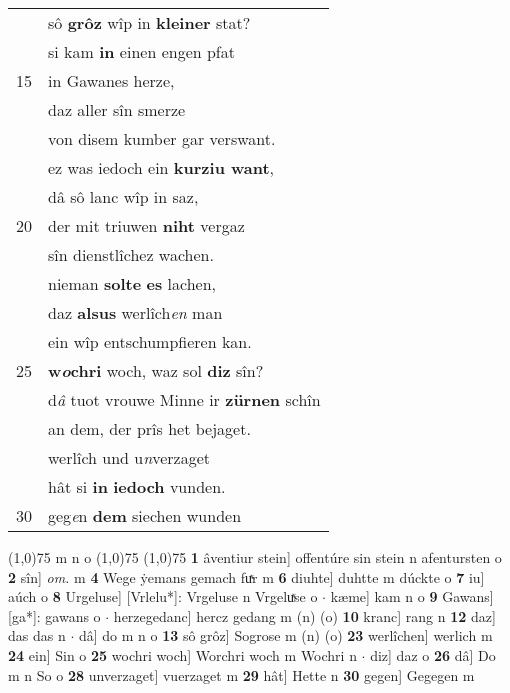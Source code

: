 \documentclass[8pt,a4paper,notitlepage]{article}
\begin{document}
\begin{table}[ht]
\begin{minipage}[t]{0.5\linewidth}
\begin{tabular}{rl}
 & sô \textbf{grôz} wîp in \textbf{kleiner} stat?\\ 
 & si kam \textbf{in} einen engen pfat\\ 
15 & in Gawanes herze,\\ 
 & daz aller sîn smerze\\ 
 & von disem kumber gar verswant.\\ 
 & ez was iedoch ein \textbf{kurziu want},\\ 
 & dâ sô lanc wîp in saz,\\ 
20 & der mit triuwen \textbf{niht} vergaz\\ 
 & sîn dienstlîchez wachen.\\ 
 & nieman \textbf{solte} \textbf{es} lachen,\\ 
 & daz \textbf{alsus} werlîch\textit{en} man\\ 
 & ein wîp entschumpfieren kan.\\ 
25 & \textbf{w\textit{o}chri} woch, waz sol \textbf{diz} sîn?\\ 
 & d\textit{â} tuot vrouwe Minne ir \textbf{zürnen} schîn\\ 
 & an dem, der prîs het bejaget.\\ 
 & werlîch und u\textit{n}verzaget\\ 
 & hât si \textbf{in} \textbf{iedoch} vunden.\\ 
30 & geg\textit{e}n \textbf{dem} siechen wunden\\ 
\end{tabular}
\scriptsize
\line(1,0){75} \newline
m n o \newline
\line(1,0){75} \newline
\newline
\line(1,0){75} \newline
\textbf{1} âventiur stein] offentúre sin stein n afentursten o \textbf{2} sîn] \textit{om.} m \textbf{4} Wege ẏemans gemach fuͯr m \textbf{6} diuhte] duhtte m dúckte o \textbf{7} iu] aúch o \textbf{8} Urgeluse] [Vrlelu*]: Vrgeluse n Vrgeluͯse o  $\cdot$ kæme] kam n o \textbf{9} Gawans] [ga*]: gawans o  $\cdot$ herzegedanc] hercz gedang m (n) (o) \textbf{10} kranc] rang n \textbf{12} daz] das das n  $\cdot$ dâ] do m n o \textbf{13} sô grôz] Sogrose m (n) (o) \textbf{23} werlîchen] werlich m \textbf{24} ein] Sin o \textbf{25} wochri woch] Worchri woch m Wochri n  $\cdot$ diz] daz o \textbf{26} dâ] Do m n So o \textbf{28} unverzaget] vuerzaget m \textbf{29} hât] Hette n \textbf{30} gegen] Gegegen m \newline
\end{minipage}
\end{table}
\end{document}

